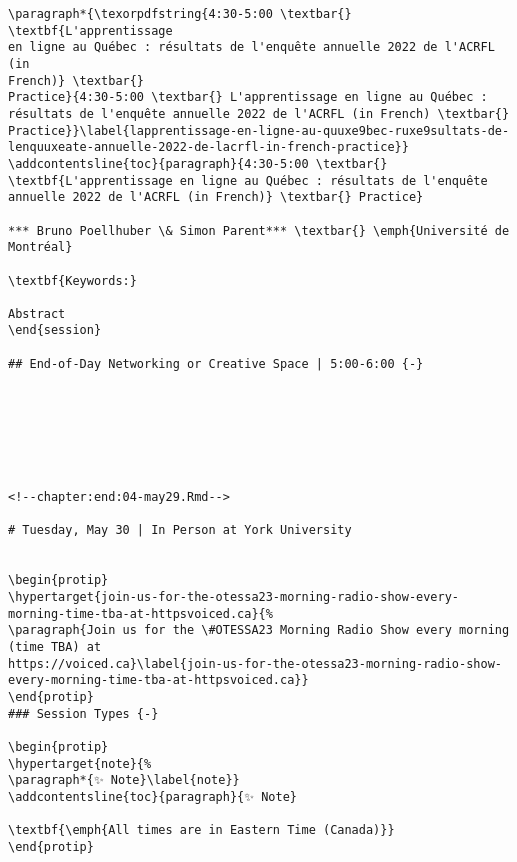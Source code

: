 \documentclass[
]{book}
\begin{document}
\begin{verbatim}
\paragraph*{\texorpdfstring{4:30-5:00 \textbar{} \textbf{L'apprentissage
en ligne au Québec : résultats de l'enquête annuelle 2022 de l'ACRFL (in
French)} \textbar{}
Practice}{4:30-5:00 \textbar{} L'apprentissage en ligne au Québec : résultats de l'enquête annuelle 2022 de l'ACRFL (in French) \textbar{} Practice}}\label{lapprentissage-en-ligne-au-quuxe9bec-ruxe9sultats-de-lenquuxeate-annuelle-2022-de-lacrfl-in-french-practice}}
\addcontentsline{toc}{paragraph}{4:30-5:00 \textbar{}
\textbf{L'apprentissage en ligne au Québec : résultats de l'enquête
annuelle 2022 de l'ACRFL (in French)} \textbar{} Practice}

*** Bruno Poellhuber \& Simon Parent*** \textbar{} \emph{Université de
Montréal}

\textbf{Keywords:}

Abstract
\end{session}

## End-of-Day Networking or Creative Space | 5:00-6:00 {-}







<!--chapter:end:04-may29.Rmd-->

# Tuesday, May 30 | In Person at York University 


\begin{protip}
\hypertarget{join-us-for-the-otessa23-morning-radio-show-every-morning-time-tba-at-httpsvoiced.ca}{%
\paragraph{Join us for the \#OTESSA23 Morning Radio Show every morning
(time TBA) at
https://voiced.ca}\label{join-us-for-the-otessa23-morning-radio-show-every-morning-time-tba-at-httpsvoiced.ca}}
\end{protip}
### Session Types {-}

\begin{protip}
\hypertarget{note}{%
\paragraph*{✨ Note}\label{note}}
\addcontentsline{toc}{paragraph}{✨ Note}

\textbf{\emph{All times are in Eastern Time (Canada)}}
\end{protip}


\end{verbatim}
\end{document}
